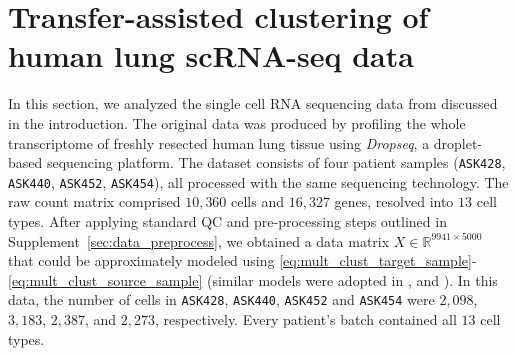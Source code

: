 \documentclass[10pt]{article}
\newcommand{\R}{\mathbb R}
\begin{document}
\section{Transfer-assisted clustering of human lung scRNA-seq data}
\label{sec:lung_atlas}
In this section, we analyzed the single cell RNA sequencing data from \cite{Vieira_Braga2019-nl} discussed in the introduction. The original data was produced by profiling the whole transcriptome of freshly resected human lung tissue using \emph{Dropseq}, a droplet-based sequencing platform. 
The dataset consists of four patient samples (\texttt{ASK428}, \texttt{ASK440}, \texttt{ASK452}, \texttt{ASK454}), all processed with the same sequencing technology. 
The raw count matrix comprised $10{,}360$ cells and $16{,}327$ genes, resolved into $13$ cell types. After applying standard QC and pre-processing steps outlined in Supplement~\ref{sec:data_preprocess}, we obtained a data matrix
$X \in \R^{9941 \times 5000}$ that could be approximately modeled using \eqref{eq:mult_clust_target_sample}-\eqref{eq:mult_clust_source_sample} (similar models were adopted in \cite{zhong2022empirical}, and \cite{cao2025modah}). In this data, the number of cells in \texttt{ASK428}, \texttt{ASK440}, \texttt{ASK452} and \texttt{ASK454} were $2{,}098$, $3{,}183$, $2{,}387$, and $2{,}273$, respectively. Every patient's batch contained all $13$ cell types.
\end{document}
